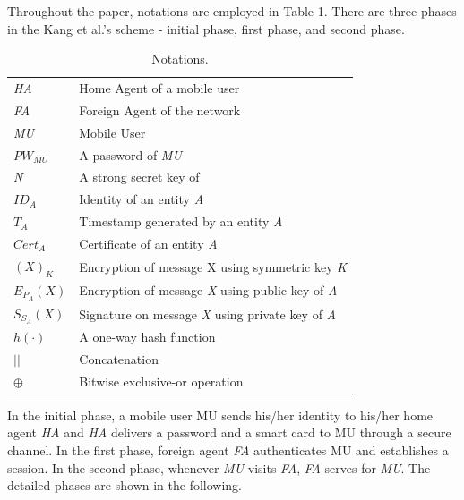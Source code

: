 \documentclass[letter]{ieice}%
\begin{document}
Throughout the paper, notations are employed in Table 1. There are three phases in the Kang et al.’s scheme - initial phase, first phase, and second phase.
\begin{table}[h!]
  \begin{center}
    \caption{Notations.}
\begin{tabular}{|l|l|}%
  \hline
  \emph{HA} & Home Agent of a mobile user \\
 \emph{ FA} & Foreign Agent of the network \\
  \emph{MU} & Mobile User \\
  \emph{${PW}_{MU}$} & A password of \emph{MU} \\
  \emph{N} &  A strong secret key of \\
  \emph{${ID}_A$} & Identity of an entity \emph{A} \\
  $T_A$ & Timestamp generated by an entity \emph{A} \\
  \emph{${Cert}_A$} & Certificate of an entity \emph{A} \\
  \emph{$(X)_K$} & Encryption of message X using symmetric key \emph{K} \\
  \emph{$E_{P_A}(X)$ }& Encryption of message \emph{X} using public key of \emph{A }\\
  \emph{$S_{S_A}(X)$} & Signature on message \emph{X} using private key of \emph{A} \\
  \emph{$h(\cdot)$ }& A one-way hash function \\
  $||$ & Concatenation \\
  $\oplus$ & Bitwise exclusive-or operation \\
  \hline
\end{tabular}
  \end{center}
\end{table}
In the initial phase, a mobile user MU sends his/her identity to his/her home agent \emph{HA} and \emph{HA} delivers a password and a smart card to MU through a secure channel. In the first phase, foreign agent \emph{FA} authenticates MU and establishes a session. In the second phase, whenever\emph{ MU} visits \emph{FA}, \emph{FA} serves for \emph{MU}. The detailed phases are shown in the following.
\end{document}
